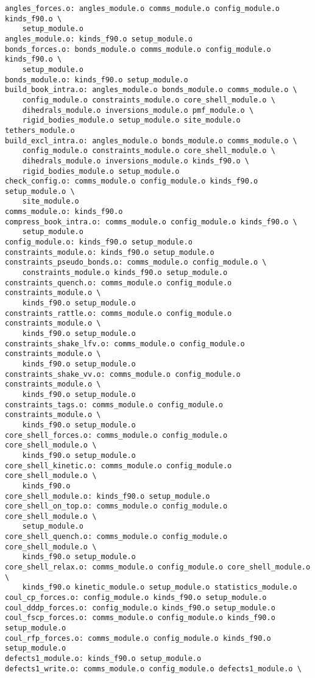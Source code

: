 \begin{verbatim}
angles_forces.o: angles_module.o comms_module.o config_module.o kinds_f90.o \
	setup_module.o
angles_module.o: kinds_f90.o setup_module.o
bonds_forces.o: bonds_module.o comms_module.o config_module.o kinds_f90.o \
	setup_module.o
bonds_module.o: kinds_f90.o setup_module.o
build_book_intra.o: angles_module.o bonds_module.o comms_module.o \
	config_module.o constraints_module.o core_shell_module.o \
	dihedrals_module.o inversions_module.o pmf_module.o \
	rigid_bodies_module.o setup_module.o site_module.o tethers_module.o
build_excl_intra.o: angles_module.o bonds_module.o comms_module.o \
	config_module.o constraints_module.o core_shell_module.o \
	dihedrals_module.o inversions_module.o kinds_f90.o \
	rigid_bodies_module.o setup_module.o
check_config.o: comms_module.o config_module.o kinds_f90.o setup_module.o \
	site_module.o
comms_module.o: kinds_f90.o
compress_book_intra.o: comms_module.o config_module.o kinds_f90.o \
	setup_module.o
config_module.o: kinds_f90.o setup_module.o
constraints_module.o: kinds_f90.o setup_module.o
constraints_pseudo_bonds.o: comms_module.o config_module.o \
	constraints_module.o kinds_f90.o setup_module.o
constraints_quench.o: comms_module.o config_module.o constraints_module.o \
	kinds_f90.o setup_module.o
constraints_rattle.o: comms_module.o config_module.o constraints_module.o \
	kinds_f90.o setup_module.o
constraints_shake_lfv.o: comms_module.o config_module.o constraints_module.o \
	kinds_f90.o setup_module.o
constraints_shake_vv.o: comms_module.o config_module.o constraints_module.o \
	kinds_f90.o setup_module.o
constraints_tags.o: comms_module.o config_module.o constraints_module.o \
	kinds_f90.o setup_module.o
core_shell_forces.o: comms_module.o config_module.o core_shell_module.o \
	kinds_f90.o setup_module.o
core_shell_kinetic.o: comms_module.o config_module.o core_shell_module.o \
	kinds_f90.o
core_shell_module.o: kinds_f90.o setup_module.o
core_shell_on_top.o: comms_module.o config_module.o core_shell_module.o \
	setup_module.o
core_shell_quench.o: comms_module.o config_module.o core_shell_module.o \
	kinds_f90.o setup_module.o
core_shell_relax.o: comms_module.o config_module.o core_shell_module.o \
	kinds_f90.o kinetic_module.o setup_module.o statistics_module.o
coul_cp_forces.o: config_module.o kinds_f90.o setup_module.o
coul_dddp_forces.o: config_module.o kinds_f90.o setup_module.o
coul_fscp_forces.o: comms_module.o config_module.o kinds_f90.o setup_module.o
coul_rfp_forces.o: comms_module.o config_module.o kinds_f90.o setup_module.o
defects1_module.o: kinds_f90.o setup_module.o
defects1_write.o: comms_module.o config_module.o defects1_module.o \

\end{verbatim}
